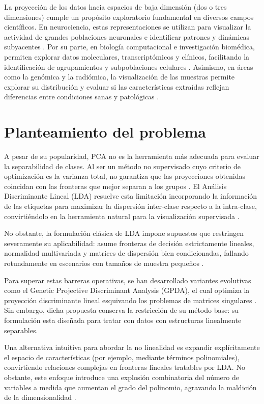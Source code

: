 La proyección de los datos hacia espacios de baja dimensión (dos o tres dimensiones) cumple un propósito exploratorio fundamental en diversos campos científicos. En neurociencia, estas representaciones se utilizan para visualizar la actividad de grandes poblaciones neuronales e identificar patrones y dinámicas subyacentes \cite{Cunningham2014}. Por su parte, en biología computacional e investigación biomédica, permiten explorar datos moleculares, transcriptómicos y clínicos, facilitando la identificación de agrupamientos y subpoblaciones celulares \cite{Kopf2021Latent}. Asimismo, en áreas como la genómica y la radiómica, la visualización de las muestras permite explorar su distribución y evaluar si las características extraídas reflejan diferencias entre condiciones sanas y patológicas \cite{bruno2020data,neha2026radiomics}.


\section{Planteamiento del problema}

A pesar de su popularidad, PCA no es la herramienta más adecuada para evaluar la separabilidad de clases. Al ser un método no supervisado cuyo criterio de optimización es la varianza total, no garantiza que las proyecciones obtenidas coincidan con las fronteras que mejor separan a los grupos \cite{rabbi2025performance}. El Análisis Discriminante Lineal (LDA) resuelve esta limitación incorporando la información de las etiquetas para maximizar la dispersión inter-clase respecto a la intra-clase, convirtiéndolo en la herramienta natural para la visualización supervisada \cite{chhikara2022data}.

No obstante, la formulación clásica de LDA impone supuestos que restringen severamente su aplicabilidad: asume fronteras de decisión estrictamente lineales, normalidad multivariada y matrices de dispersión bien condicionadas, fallando rotundamente en escenarios con tamaños de muestra pequeños \cite{feng2021comparison}. 

Para superar estas barreras operativas, se han desarrollado variantes evolutivas como el Genetic Projective Discriminant Analysis (GPDA), el cual optimiza la proyección discriminante lineal esquivando los problemas de matrices singulares \cite{medina2025genetic}. Sin embargo, dicha propuesta conserva la restricción de su método base: su formulación esta diseñada para tratar con datos con estructuras linealmente separables.

Una alternativa intuitiva para abordar la no linealidad es expandir explícitamente el espacio de características (por ejemplo, mediante términos polinomiales), convirtiendo relaciones complejas en fronteras lineales tratables por LDA. No obstante, este enfoque introduce una explosión combinatoria del número de variables a medida que aumentan el grado del polinomio, agravando la maldición de la dimensionalidad \cite{bishop2006pattern}.

